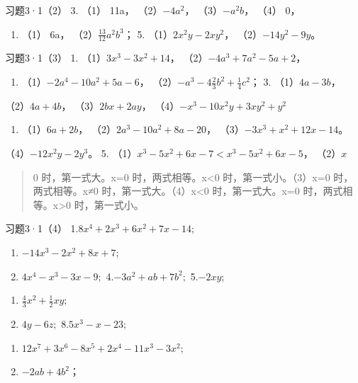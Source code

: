 习题3·1（2） 3. （1） 11a， （2）\(-4a^{2}\)， （3）\(-a^{2}b\)， （4）
0，

\begin{enumerate}[start=4]
\item
  （1） 6a， （2）\(\frac{13}{12} a^2 b^3\)； 5.
  （1）\(2x^2y - 2xy^2\)， （2）\(-14y^2 - 9y\)。
\end{enumerate}

习题3·1（3） 1. （1）\(3x^{3} - 3x^{2} + 14\)，
（2）\(-4a^{3} + 7a^{2} - 5a + 2\)，

\begin{enumerate}[start=2]
\item
  （1）\(-2a^{4} - 10a^{2} + 5a - 6\)，
  （2）\(-a^{3} - 4\frac{2}{3}b^{2} + \frac{1}{4}c^{2}\)； 3.
  （1）\(4a - 3b\)，
\end{enumerate}

（2）\(4a + 4b\)， （3）\(2bx + 2ay\)，
（4）\(-x^{3} - 10x^{2}y + 3xy^{2} + y^{2}\)

\begin{enumerate}[start=4]
\item
  （1）\(6a + 2b\)， （2）\(2a^3 - 10a^2 + 8a - 20\)，
  （3）\(-3x^3 + x^2 + 12x - 14\)。
\end{enumerate}

（4）\(-12x^{2}y - 2y^{3}\)。 5.
（1）\(x^{3} - 5x^{2} + 6x - 7 < x^{3} - 5x^{2} + 6x - 5\)， （2）\(x\)

\begin{quote}
0 时，第一式大。x=0 时，两式相等。x\textless0 时，第一式小。（3）x=0
时，两式相等。x≠0 时，第一式大。（4）x\textless0 时，第一式大。x=0
时，两式相等。x\textgreater0 时，第一式小。
\end{quote}

习题3·1（4） 1.\(8x^{4} + 2x^{3} + 6x^{2} + 7x - 14;\)
\begin{enumerate}[start=2]
\item
  \(-14x^{3} - 2x^{2} + 8x + 7;\)
\item
  \(4x^{4} - x^{3} - 3x - 9;\) 4.\(-3a^{2} + ab + 7b^{2};\) 5.\(-2xy;\)
\end{enumerate}
\begin{enumerate}[start=6]
\item
  \(\frac{4}{3} x^2 +\frac{1}{2} xy;\)
\item
  \(4y - 6z;\) 8.\(5x^{3} - x - 23;\)
\end{enumerate}
\begin{enumerate}[start=9]
\item
  \(12x^{7} + 3x^{6} - 8x^{5} + 2x^{4} - 11x^{3} - 3x^{2};\)
\item
  \(-2ab + 4b^{2}\)；
\end{enumerate}

